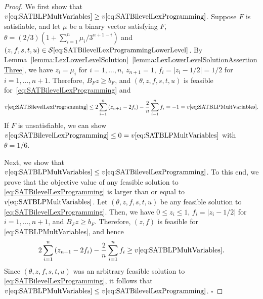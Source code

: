 \documentclass[runningheads,orivec]{llncs}
\newcommand{\MacroColor}[1]{#1}
\newcommand{\MyQED}{\mbox{}\hfill$\square$}
\newcommand{\NVariables}{\MacroColor{n}}
\newcommand{\OptValFunc}{\MacroColor{v}}
\newcommand{\OptSolSet}{\MacroColor{\mathcal{S}}}
\newcommand{\SATBooleanFormula}{\MacroColor{F}}
\newcommand{\ReformZ}{\MacroColor{z}}
\newcommand{\ReformAugFrac}{\MacroColor{f}}
\newcommand{\LexUVar}{\MacroColor{\theta}}
\newcommand{\LexLVarS}{\MacroColor{s}}
\newcommand{\LexLVarT}{\MacroColor{t}}
\newcommand{\LexLVarU}{\MacroColor{u}}
\newcommand{\BinaryVector}{\MacroColor{\mu}}
\begin{document}
\begin{proof}
We first show that $\OptValFunc\eqref{eq:SATBLPMultVariables} \ge \OptValFunc\eqref{eq:SATBilevelLexProgramming}$.
Suppose $\SATBooleanFormula$ is satisfiable, and let $\BinaryVector$ be a binary vector satisfying $\SATBooleanFormula$, $\LexUVar = (2/3) (1 + \sum_{i = 1}^{\NVariables} \BinaryVector_i/3^{\NVariables + 1 - i})$ and $(\ReformZ, \ReformAugFrac, \LexLVarS, \LexLVarT, \LexLVarU) \in \OptSolSet\eqref{eq:SATBilevelLexProgrammingLowerLevel}$.
By Lemma~\ref{lemma:LexLowerLevelSolution}~\ref{lemma:LexLowerLevelSolutionAssertionThree}, we have $\ReformZ_i = \BinaryVector_i$ for $i = 1, \ldots, \NVariables$, $\ReformZ_{\NVariables + 1} = 1$, $\ReformAugFrac_i = |\ReformZ_i - 1/2| = 1/2$ for $i = 1, \ldots, \NVariables + 1$.
Therefore, $B_{\SATBooleanFormula} \ReformZ \ge b_{\SATBooleanFormula}$, and $(\LexUVar, \ReformZ, \ReformAugFrac, \LexLVarS, \LexLVarT, \LexLVarU)$ is feasible for~\eqref{eq:SATBilevelLexProgramming} and
$$
\OptValFunc\eqref{eq:SATBilevelLexProgramming}
\le
2 \sum_{i = 1}^{n} \left(\ReformZ_{\NVariables + 1} - 2 \ReformAugFrac_i \right) - \frac{2}{n} \sum_{i = 1}^n \ReformAugFrac_i
=
-1
=
\OptValFunc\eqref{eq:SATBLPMultVariables}.
$$
If $\SATBooleanFormula$ is unsatisfiable, we can show
$
\OptValFunc\eqref{eq:SATBilevelLexProgramming}
\le
0
=
\OptValFunc\eqref{eq:SATBLPMultVariables}
$
with $\LexUVar = 1/6$.

Next, we show that $\OptValFunc\eqref{eq:SATBLPMultVariables} \le \OptValFunc\eqref{eq:SATBilevelLexProgramming}$.
To this end, we prove that the objective value of any feasible solution to \eqref{eq:SATBilevelLexProgramming} is larger than or equal to $\OptValFunc\eqref{eq:SATBLPMultVariables}$.
Let $(\LexUVar, \ReformZ, \ReformAugFrac, \LexLVarS, \LexLVarT, \LexLVarU)$ be any feasible solution to \eqref{eq:SATBilevelLexProgramming}.
Then, we have $0 \le \ReformZ_i \le 1$, $\ReformAugFrac_i = |\ReformZ_i - 1/2|$ for $i = 1, \ldots, \NVariables + 1$, and $B_{\SATBooleanFormula} \ReformZ \ge b_{\SATBooleanFormula}$.
Therefore, $(\ReformZ, \ReformAugFrac)$ is feasible for \eqref{eq:SATBLPMultVariables}, and hence
$$
2 \sum_{i = 1}^{n} \left(\ReformZ_{\NVariables + 1} - 2 \ReformAugFrac_i \right) - \frac{2}{n} \sum_{i = 1}^n \ReformAugFrac_i
\ge \OptValFunc\eqref{eq:SATBLPMultVariables}.
$$
Since $(\LexUVar, \ReformZ, \ReformAugFrac, \LexLVarS, \LexLVarT, \LexLVarU)$ was an arbitrary feasible solution to \eqref{eq:SATBilevelLexProgramming}, it follows that $\OptValFunc\eqref{eq:SATBLPMultVariables} \le \OptValFunc\eqref{eq:SATBilevelLexProgramming}$.
\MyQED
\end{proof}
\end{document}
